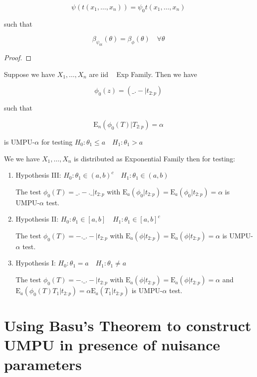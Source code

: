 \documentclass[11pt,fleqn]{book} %
\newcommand{\E}{\mathrm{E}}
\begin{document}
		$$\psi(t(x_1, \dots, x_n)) = \psi_0 t(x_1, \dots, x_n) $$

such that

		$$\beta_{\psi_{0t}}(\theta) = \beta_{\phi}(\theta)  \quad \forall \theta $$


\begin{proof}
	

\end{proof}

\begin{theorem}[4.6]
	Suppose we have $X_1, \dots, X_n$ are iid ~ Exp Family. Then we have

			$$\phi_0(z) = (\_.-|t_{2:p}) $$

	such that 

			$$\E_n (\phi_0(T) | T_{2:p}) = \alpha $$

	is UMPU-$\alpha$ for testing $H_0: \theta_1 \leq a \quad H_1: \theta_1 > a$
\end{theorem}

\begin{theorem}[4.7]
	We we have $X_1, \dots, X_n$ is distributed as Exponential Family then for testing:

		\begin{enumerate}
			\item Hypothesis III: $H_0: \theta_1 \in (a, b)^c \quad H_1: \theta_1 \in (a, b)$

			The test $\phi_0(T) = \_.-.\_|t_{2:p}$ with $\E_a(\phi_0|t_{2:p}) = \E_a (\phi_0|t_{2:p}) = \alpha$ is UMPU-$\alpha$ test. 
			
			\item Hypothesis II: $H_0: \theta_1 \in [a,b] \quad H_1: \theta_1 \in [a,b]^c$

			The test $\phi_0(T) = -.\_.-|t_{2:p}$ with $\E_a(\phi|t_{2:p}) = \E_a (\phi|t_{2:p}) = \alpha$ is UMPU-$\alpha$ test.

			\item Hypothesis I: $H_0: \theta_1 =a \quad H_1: \theta_1 \neq a$

			The test $\phi_0(T) = -.\_.-|t_{2:p}$ with $\E_a(\phi|t_{2:p}) = \E_a (\phi|t_{2:p}) = \alpha$ and $\E_a (\phi_0 (T) T_1| t_{2:p}) = \alpha \E_a(T_1 |t_{2:p})$ is UMPU-$\alpha$ test. 
		\end{enumerate}
\end{theorem}


\section{Using Basu's Theorem to construct UMPU in presence of nuisance parameters}
\end{document}
